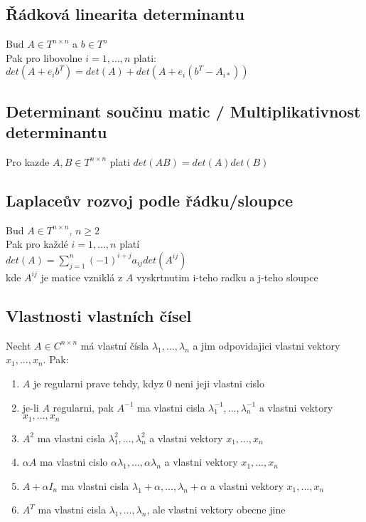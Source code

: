 \documentclass[a4paper]{article}
\begin{document}
\subsection*{Řádková linearita determinantu}
Bud $A \in T^{n \times n}$ a $b \in T^n$\\
Pak pro libovolne $i = 1, ..., n$ plati:\\
$det(A + e_ib^T) = det(A) + det(A + e_i(b^T - A_{i*}))$


\subsection*{Determinant součinu matic / Multiplikativnost determinantu}
Pro kazde $A, B \in T^{n\times n}$ plati $det(AB) = det(A) det(B)$


\subsection*{Laplaceův rozvoj podle řádku/sloupce}
Bud $A \in T^{n\times n}$, $n \geq 2$\\
Pak pro každé $i = 1, ... , n$ platí\\
$det(A) = \sum^n_{j=1}(-1)^{i+j} a_{ij} det(A^{ij})$\\
kde $A^{ij}$ je matice vzniklá z $A$ vyskrtnutim i-teho radku a j-teho sloupce


\subsection*{Vlastnosti vlastních čísel}
Necht $A \in C^{n\times n}$ má vlastní čísla $\lambda_1, ... , \lambda_n$
a jim odpovidajici vlastni vektory $x_1, ... , x_n$. Pak:
\begin{enumerate}
	\item $A$ je regularni prave tehdy, kdyz 0 neni jeji vlastni cislo
	\item je-li $A$ regularni, pak $A^{-1}$ ma vlastni cisla $\lambda_1^{-1},...,\lambda_n^{-1}$ a vlastni vektory $x_1,...,x_n$
	\item $A^2$ ma vlastni cisla $\lambda_1^2,...,\lambda_n^2$ a vlastni vektory $x_1,...,x_n$
	\item $\alpha A$ ma vlastni cislo $\alpha\lambda_1,...,\alpha\lambda_n$ a vlastni vektory $x_1,...,x_n$
	\item $A+\alpha I_n$ ma vlastni cisla $\lambda_1+\alpha,...,\lambda_n+\alpha$ a vlastni vektory $x_1,...,x_n$
	\item $A^T$ ma vlastni cisla $\lambda_1,...,\lambda_n$, ale vlastni vektory obecne jine
\end{enumerate}
\end{document}

